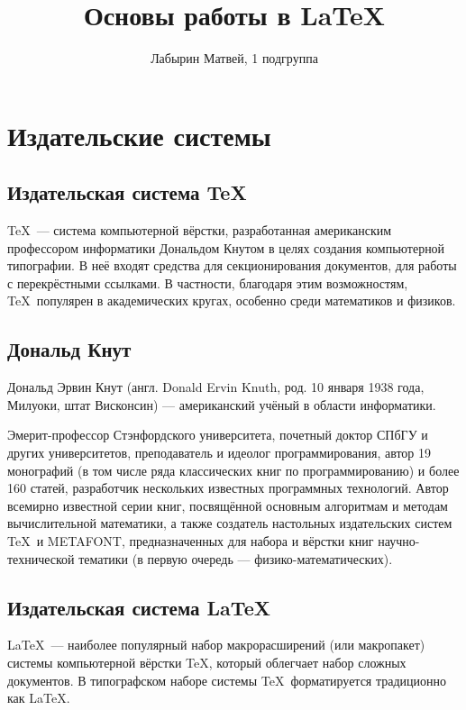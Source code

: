 \documentclass[12pt]{article}
\author{Лабырин Матвей, 1 подгруппа}
\title{Основы работы в \LaTeX}
\begin{document}
\maketitle

\tableofcontents

\section{Издательские системы}

\subsection{Издательская система \TeX}

\TeX~--- система компьютерной вёрстки, разработанная американским профессором информатики Дональдом Кнутом в целях создания компьютерной типографии.
В неё входят средства для секционирования документов, для работы с перекрёстными ссылками.
В частности, благодаря этим возможностям, \TeX~популярен в академических кругах, особенно среди математиков и физиков.

\subsection{Дональд Кнут}

Дональд Эрвин Кнут (англ. Donald Ervin Knuth, род. 10 января 1938 года, Милуоки, штат Висконсин) — американский учёный в области информатики.

Эмерит-профессор Стэнфордского университета, почетный доктор СПбГУ и других университетов, преподаватель и идеолог программирования, автор 19 монографий (в том числе ряда классических книг по программированию) и более 160 статей, разработчик нескольких известных программных технологий.
Автор всемирно известной серии книг, посвящённой основным алгоритмам и методам вычислительной математики, а также создатель настольных издательских систем \TeX~и METAFONT, предназначенных для набора и вёрстки книг научно-технической тематики (в первую очередь — физико-математических).

\subsection{Издательская система \LaTeX}

\LaTeX~--- наиболее популярный набор макрорасширений (или макропакет) системы компьютерной вёрстки \TeX, который облегчает набор сложных документов.
В типографском наборе системы \TeX~форматируется традиционно как \LaTeX.
\end{document}
